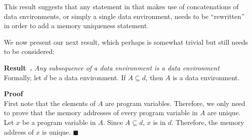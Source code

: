 \documentclass[11pt]{article}
\newcounter{example}
\newcounter{result}
\newenvironment{result}[1][]{\stepcounter{result}\par\medskip\noindent
\textbf{Result~\theresult. #1} \rmfamily}{\medskip}
\def\QEDmark{$\blacksquare$}
\newenvironment{proof}[1][]{\par\medskip\noindent
\textbf{Proof~ #1} \rmfamily}{\medskip\hfill\QEDmark}
\begin{document}
This result suggests that any statement in \cite{baber} that makes use of concatenations of data environments, or simply a single data environment, needs to be ``rewritten'' in order to add a memory uniqueness statement.

We now present our next result, which perhaps is somewhat trivial but still needs to be considered:

\begin{result} \emph{Any subsequence of a data environment is a data environment} \\
Formally, let $d$ be a data environment. If $A\subseteq d$, then $A$ is a data environment.
\end{result}

\begin{proof} \\
First note that the elements of $A$ are program variables. Therefore, we only need to prove that the memory addresses of every program variable in $A$ are unique. Let $x$ be a program variable in $A$. Since $A\subseteq d$, $x$ is in $d$. Therefore, the memory address of $x$ is unique.
\end{proof}
%
%
%
%
%
\end{document}
